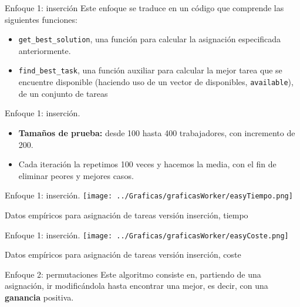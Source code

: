 \documentclass[10pt, xcolor=table]{beamer}
\begin{document}
\begin{frame}{Enfoque 1: inserción}
Este enfoque se traduce en un código que comprende las siguientes funciones:

\begin{itemize}
	\item \texttt{get\_best\_solution}, una función para calcular la asignación especificada anteriormente.
	\item \texttt{find\_best\_task}, una función auxiliar para calcular la mejor tarea que se encuentre disponible (haciendo uso de un vector de disponibles, \texttt{available}), de un conjunto de tareas
\end{itemize}
\end{frame}

\begin{frame}{Enfoque 1: inserción. }
\begin{itemize}
	\item \textbf{Tamaños de prueba:} desde 100 hasta 400 trabajadores, con incremento de 200.
	\item Cada iteración la repetimos 100 veces y hacemos la media, con el fin de eliminar peores y mejores casos.
\end{itemize}
\end{frame}

\begin{frame}[fragile]{Enfoque 1: inserción. }
\texttt{[image: ../Graficas/graficasWorker/easyTiempo.png]}
\begin{center}
	\footnotesize{Datos empíricos para asignación de tareas versión inserción, tiempo}
\end{center}
\end{frame}

\begin{frame}[fragile]{Enfoque 1: inserción. }
\texttt{[image: ../Graficas/graficasWorker/easyCoste.png]}
\begin{center}
	\footnotesize{Datos empíricos para asignación de tareas versión inserción, coste}
\end{center}
\end{frame}

\begin{frame}{Enfoque 2: permutaciones}
Este algoritmo consiste en, partiendo de una asignación, ir modificándola hasta encontrar una mejor, es decir, con una \textbf{ganancia} positiva.
\end{frame}
\end{document}
